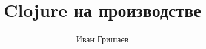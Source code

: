 \documentclass[10pt $DRAFT]{$DOCUMENT} %
\author{Иван Гришаев}
\title{Clojure на производстве}
\date{}
\begin{document}




\ifridero

\else

\fi

\let\Contentsline\contentsline
\renewcommand\contentsline[3]{\thispagestyle{empty}\Contentsline{#1}{#2}{#3}}
\cleardoublepage
\tableofcontents

\clearpage


\blank
\blank
\blank
\blank
\blank
\blank
\blank

\ifprint
\backmatter
\fi



\makeatletter\@openrightfalse\makeatother

\printindex

\ifprint

\fi

\ifebook

\fi
\end{document}
